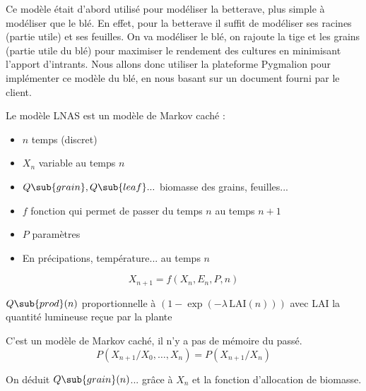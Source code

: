 Ce modèle était d'abord utilisé pour modéliser la betterave, 
plus simple à modéliser que le blé. 
En effet, pour la betterave il suffit de modéliser 
ses racines (partie utile) et ses feuilles.
On va modéliser le blé, on rajoute la tige et les grains (partie utile du blé)
pour maximiser le rendement des cultures en minimisant l’apport d’intrants.
Nous allons donc utiliser la plateforme Pygmalion pour implémenter ce modèle du blé,
en nous basant sur un document fourni par le client.

Le modèle LNAS est un modèle de Markov caché : 
\begin{itemize}
  \item $n$  temps (discret)     
  \item $X_n$ variable au temps $n$       
  \item $Q\sub{grain}, Q\sub{leaf}... $ biomasse des grains, feuilles...      
  \item $f$ fonction qui permet de passer du temps $n$ au temps $n+1$     
  \item $P$ paramètres      
  \item En précipations, température... au temps $n$
\end{itemize}

\begin{equation}
  X_{n+1} = f(X_n,E_n,P,n)
\end{equation} 

$Q\sub{prod}(n)$ proportionnelle à $(1-\exp{(-\lambda \, \text{LAI}(n))})$ 
avec LAI la quantité lumineuse reçue par la plante

C’est un modèle de Markov caché, il n'y a pas de mémoire du passé.
\[
  P(X_{n+1}/X_0,…,X_n) = P(X_{n+1} / X_n) 
\] 

On déduit $Q\sub{grain}(n)$... grâce à $X_n$ et la fonction d'allocation de biomasse.



